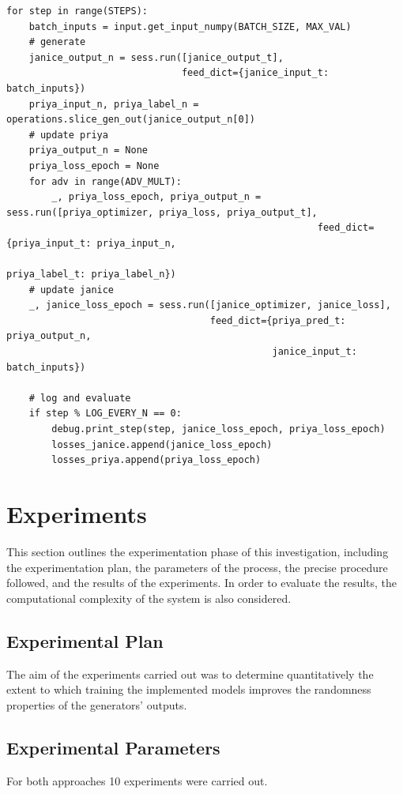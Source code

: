 \documentclass[12pt, titlepage]{report}
\theoremstyle{definition}
\begin{document}
\begin{verbatim}
for step in range(STEPS):
    batch_inputs = input.get_input_numpy(BATCH_SIZE, MAX_VAL)
    # generate
    janice_output_n = sess.run([janice_output_t],
                               feed_dict={janice_input_t: batch_inputs})
    priya_input_n, priya_label_n = operations.slice_gen_out(janice_output_n[0])
    # update priya
    priya_output_n = None
    priya_loss_epoch = None
    for adv in range(ADV_MULT):
        _, priya_loss_epoch, priya_output_n = sess.run([priya_optimizer, priya_loss, priya_output_t],
                                                       feed_dict={priya_input_t: priya_input_n,
                                                                  priya_label_t: priya_label_n})
    # update janice
    _, janice_loss_epoch = sess.run([janice_optimizer, janice_loss],
                                    feed_dict={priya_pred_t: priya_output_n,
                                               janice_input_t: batch_inputs})

    # log and evaluate
    if step % LOG_EVERY_N == 0:
        debug.print_step(step, janice_loss_epoch, priya_loss_epoch)
        losses_janice.append(janice_loss_epoch)
        losses_priya.append(priya_loss_epoch)
\end{verbatim}



\chapter{Experiments}\label{chapter:experiments}
This section outlines the experimentation phase of this investigation, including the experimentation plan, the parameters of the process, the precise procedure followed, and the results of the experiments. In order to evaluate the results, the computational complexity of the system is also considered.


\section{Experimental Plan}
The aim of the experiments carried out was to determine quantitatively the extent to which training the implemented models improves the randomness properties of the generators' outputs. 


\section{Experimental Parameters}
For both approaches 10 experiments were carried out. 
\end{document}
